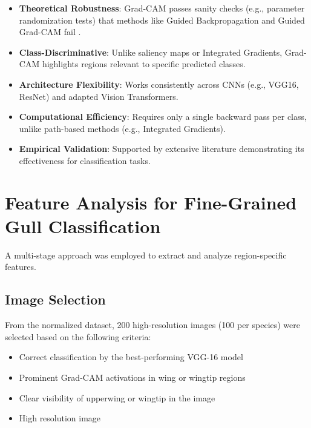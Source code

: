 \documentclass[a4paper,12pt]{report}
\begin{document}
\begin{itemize}
\item \textbf{Theoretical Robustness}: Grad-CAM passes sanity checks (e.g., parameter randomization tests) that methods like Guided Backpropagation and Guided Grad-CAM fail \citep{Adebayo2018}.
\item \textbf{Class-Discriminative}: Unlike saliency maps or Integrated Gradients, Grad-CAM highlights regions relevant to specific predicted classes.
\item \textbf{Architecture Flexibility}: Works consistently across CNNs (e.g., VGG16, ResNet) and adapted Vision Transformers.
\item \textbf{Computational Efficiency}: Requires only a single backward pass per class, unlike path-based methods (e.g., Integrated Gradients).
\item \textbf{Empirical Validation}: Supported by extensive literature \citep{Selvaraju_2019, chefer2021generic} demonstrating its effectiveness for classification tasks.
\end{itemize}

\section{Feature Analysis for Fine-Grained Gull Classification}

A multi-stage approach was employed to extract and analyze region-specific features.

\subsection{Image Selection}
From the normalized dataset, 200 high-resolution images (100 per species) were selected based on the following criteria:
\begin{itemize}
\item Correct classification by the best-performing VGG-16 model
\item Prominent Grad-CAM activations in wing or wingtip regions
\item Clear visibility of upperwing or wingtip in the image
\item High resolution image
\end{itemize}
\end{document}
